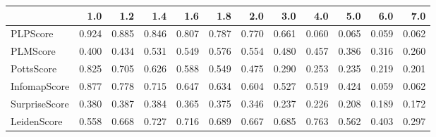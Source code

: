 \begin{tabular}{lrrrrrrrrrrr}
\toprule
{} &   1.0 &   1.2 &   1.4 &   1.6 &   1.8 &   2.0 &   3.0 &   4.0 &   5.0 &   6.0 &   7.0 \\
\midrule
PLPScore      & 0.924 & 0.885 & 0.846 & 0.807 & 0.787 & 0.770 & 0.661 & 0.060 & 0.065 & 0.059 & 0.062 \\
PLMScore      & 0.400 & 0.434 & 0.531 & 0.549 & 0.576 & 0.554 & 0.480 & 0.457 & 0.386 & 0.316 & 0.260 \\
PottsScore    & 0.825 & 0.705 & 0.626 & 0.588 & 0.549 & 0.475 & 0.290 & 0.253 & 0.235 & 0.219 & 0.201 \\
InfomapScore  & 0.877 & 0.778 & 0.715 & 0.647 & 0.634 & 0.604 & 0.527 & 0.519 & 0.424 & 0.059 & 0.062 \\
SurpriseScore & 0.380 & 0.387 & 0.384 & 0.365 & 0.375 & 0.346 & 0.237 & 0.226 & 0.208 & 0.189 & 0.172 \\
LeidenScore   & 0.558 & 0.668 & 0.727 & 0.716 & 0.689 & 0.667 & 0.685 & 0.763 & 0.562 & 0.403 & 0.297 \\
\bottomrule
\end{tabular}
